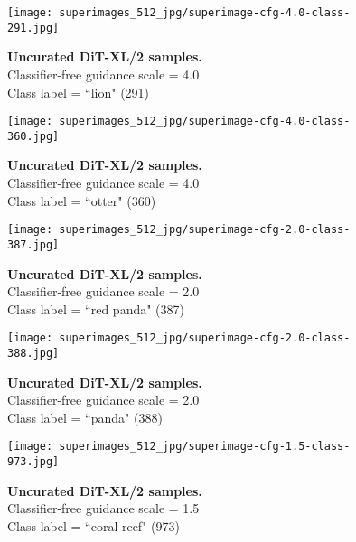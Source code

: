 \documentclass[10pt,twocolumn,letterpaper]{article}
\begin{document}
\begin{figure}\centering
\texttt{[image: superimages\_512\_jpg/superimage-cfg-4.0-class-291.jpg]}
\caption{\textbf{Uncurated  DiT-XL/2 samples.} \\Classifier-free guidance scale = 4.0\\Class label = ``lion" (291)}\vspace{-2mm}
\label{fig:samples512_7}
\end{figure}

\begin{figure}\centering
\texttt{[image: superimages\_512\_jpg/superimage-cfg-4.0-class-360.jpg]}
\caption{\textbf{Uncurated  DiT-XL/2 samples.} \\Classifier-free guidance scale = 4.0\\Class label = ``otter" (360)}\vspace{-2mm}
\label{fig:samples512_8}
\end{figure}

\clearpage
\pagestyle{fancy}
\fancyhead{}

\begin{figure}\centering
\texttt{[image: superimages\_512\_jpg/superimage-cfg-2.0-class-387.jpg]}
\caption{\textbf{Uncurated  DiT-XL/2 samples.} \\Classifier-free guidance scale = 2.0\\Class label = ``red panda" (387)}\vspace{-2mm}
\label{fig:samples512_9}
\end{figure}

\begin{figure}\centering
\texttt{[image: superimages\_512\_jpg/superimage-cfg-2.0-class-388.jpg]}
\caption{\textbf{Uncurated  DiT-XL/2 samples.} \\Classifier-free guidance scale = 2.0\\Class label = ``panda" (388)}\vspace{-2mm}
\label{fig:samples512_10}
\end{figure}

\clearpage
\pagestyle{fancy}
\fancyhead{}

\begin{figure}\centering
\texttt{[image: superimages\_512\_jpg/superimage-cfg-1.5-class-973.jpg]}
\caption{\textbf{Uncurated  DiT-XL/2 samples.} \\Classifier-free guidance scale = 1.5\\Class label = ``coral reef" (973)}\vspace{-2mm}
\label{fig:samples512_11}
\end{figure}
\end{document}
